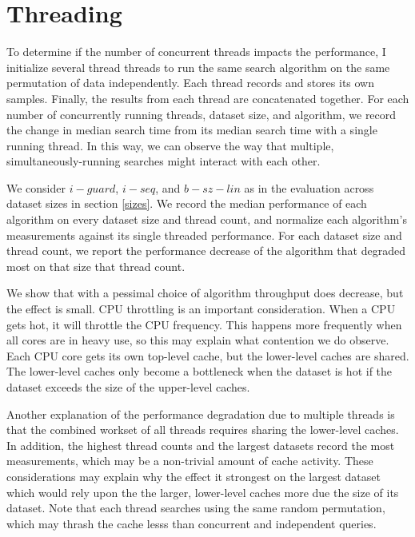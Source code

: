\documentclass[twocolumn]{article}
\begin{document}
\section{Threading}
To determine if the number of concurrent threads impacts the performance, I initialize several thread threads to run the same search algorithm on the same permutation of data independently. Each thread records and stores its own samples. Finally, the results from each thread are concatenated together. For each number of concurrently running threads, dataset size, and algorithm, we record the change in median search time from its median search time with a single running thread. In this way, we can observe the way that multiple, simultaneously-running searches might interact with each other.

We consider $i-guard$, $i-seq$, and $b-sz-lin$ as in the evaluation across dataset sizes in section \ref{sizes}. We record the median performance of each algorithm on every dataset size and thread count, and normalize each algorithm's measurements against its single threaded performance. For each dataset size and thread count, we report the performance decrease of the algorithm that degraded most on that size that thread count. 

We show that with a pessimal choice of algorithm throughput does decrease, but the effect is small. CPU throttling is an important consideration. When a CPU gets hot, it will throttle the CPU frequency. This happens more frequently when all cores are in heavy use, so this may explain what contention we do observe. Each CPU core gets its own top-level cache, but the lower-level caches are shared. The lower-level caches only become a bottleneck when the dataset is hot if the dataset exceeds the size of the upper-level caches.

Another explanation of the performance degradation due to multiple threads is that the combined workset of all threads requires sharing the lower-level caches. In addition, the highest thread counts and the largest datasets record the most measurements, which may be a non-trivial amount of cache activity. These considerations may explain why the effect it strongest on the largest dataset which would rely upon the the larger, lower-level caches more due the size of its dataset. Note that each thread searches using the same random permutation, which may thrash the cache lesss than concurrent and independent queries.
\end{document}

